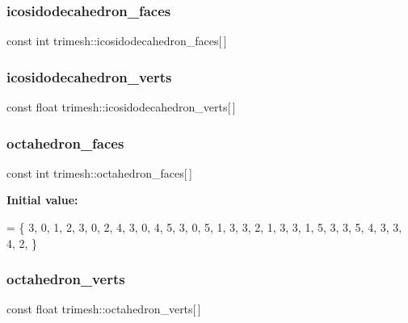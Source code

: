 \subsubsection{\texorpdfstring{icosidodecahedron\+\_\+faces}{icosidodecahedron\_faces}}
{\footnotesize\ttfamily const int trimesh\+::icosidodecahedron\+\_\+faces\mbox{[}$\,$\mbox{]}\hspace{0.3cm}{\ttfamily [static]}}

\mbox{\label{namespacetrimesh_abd2c275c04d7dbd15481684b1c0d4590}} 
\subsubsection{\texorpdfstring{icosidodecahedron\+\_\+verts}{icosidodecahedron\_verts}}
{\footnotesize\ttfamily const float trimesh\+::icosidodecahedron\+\_\+verts\mbox{[}$\,$\mbox{]}\hspace{0.3cm}{\ttfamily [static]}}

\mbox{\label{namespacetrimesh_a52acb89d1dfc13df3e0d82babb32172e}} 
\subsubsection{\texorpdfstring{octahedron\+\_\+faces}{octahedron\_faces}}
{\footnotesize\ttfamily const int trimesh\+::octahedron\+\_\+faces\mbox{[}$\,$\mbox{]}\hspace{0.3cm}{\ttfamily [static]}}

{\bfseries Initial value\+:}
\begin{DoxyCode}
= \{
    3, 0, 1, 2,
    3, 0, 2, 4,
    3, 0, 4, 5,
    3, 0, 5, 1,
    3, 3, 2, 1,
    3, 3, 1, 5,
    3, 3, 5, 4,
    3, 3, 4, 2,
\}
\end{DoxyCode}
\mbox{\label{namespacetrimesh_a06c2c3733cfa4ce507f15a1abd7148e7}} 
\subsubsection{\texorpdfstring{octahedron\+\_\+verts}{octahedron\_verts}}
{\footnotesize\ttfamily const float trimesh\+::octahedron\+\_\+verts\mbox{[}$\,$\mbox{]}\hspace{0.3cm}{\ttfamily [static]}}

